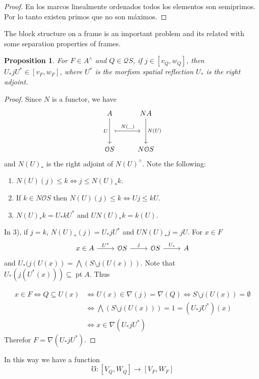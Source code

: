 \documentclass[11pt]{amsart}
\DeclareMathOperator{\pt}{pt}
\theoremstyle{plain}
\newtheorem{prop}[thm]{Proposition}
\theoremstyle{definition}
\begin{document}
\begin{proof}
    En los marcos linealmente ordenados todos los elementos son semiprimos. Por lo tanto existen primos que no son máximos.
\end{proof}

The block structure on a frame is an important problem and its related with some separation properties of frames.
\begin{prop}\label{morfismo}
For $F\in A^\wedge$ and $Q\in\mathcal{Q}S$, if $j\in [v_Q, w_Q]$, then $U_*jU^*\in [v_F, w_F]$, where $U^*$ is the morfism spatial reflection $U_*$ is the right adjoint.
\end{prop}

\begin{proof}
Since $N$ is a functor, we have 
\[\begin{tikzcd}
	A & NA \\
	\\
	{\mathcal{O}S} & {N\mathcal{O}S}
	\arrow[""{name=0, anchor=center, inner sep=0}, "U"', from=1-1, to=3-1]
	\arrow[""{name=1, anchor=center, inner sep=0}, "{N(U)}", from=1-2, to=3-2]
	\arrow["{N(\_)}", shorten <=7pt, shorten >=7pt, maps to, from=0, to=1]
\end{tikzcd}\]
and $N(U)_*$ is the right adjoint of $N(U)^\wedge$. Note the following:
\begin{enumerate}
	\item $N(U)(j)\leq k\Leftrightarrow j\leq N(U)_*k$.
	\item If $k\in N\mathcal{O}S$ then $N(U)(j)\leq k\Leftrightarrow Uj\leq kU$.
	\item $N(U)_*k=U_*kU^*$ and $UN(U)_*k=k(U)$.
\end{enumerate}
In 3), if $j=k$, $N(U)_*(j)=U_*jU^*$ and $UN(U)_*j=jU$. For $x\in F$
\[\begin{tikzcd}
	x\in A & {\mathcal{O}S} & {\mathcal{O}S} & A
	\arrow["{U^*}", from=1-1, to=1-2]
	\arrow["j", from=1-2, to=1-3]
	\arrow["{U_*}", from=1-3, to=1-4]
\end{tikzcd}\]
and $U_*(j(U(x))=\bigwedge(S\setminus j(U(x)))$. Note that $U_*(j(U^*(x)))\subseteq \pt A$. Thus

\[
\begin{split}
x\in F \Leftrightarrow Q\subseteq U(x) &\Leftrightarrow U(x)\in \nabla(j)=\nabla(Q)\Leftrightarrow S\setminus j(U(x))=\emptyset\\
& \Leftrightarrow \bigwedge (S\setminus j(U(x)))=1=(U_*jU^*)(x)\\
&\Leftrightarrow x\in \nabla(U_*jU^*)
\end{split}
\]
Therefor $F=\nabla(U_*jU^*)$.
\end{proof}
In this way we have a function 
\[
\mho\colon [V_Q, W_Q]\to [V_F, W_F]
\]
\end{document}
